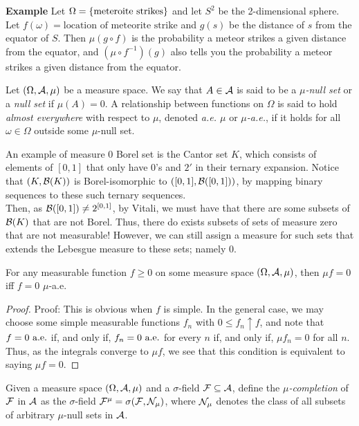 \begin{example}{\textbf{Example}}
    Let $\Omega = \{\tt{meteroite strikes}\}$ and let $S^2$ be the 2-dimensional sphere. Let $f(\omega) = \text{location of meteorite strike}$ and $g(s)$ be the distance of $s$ from the equator of $S$. Then $\mu(g \circ f)$ is the probability a meteor strikes a given distance from the equator, and $(\mu \circ f^{-1})(g)$ also tells you the probability a meteor strikes a given distance from the equator.  
\end{example}

\begin{definition}
   Let $(\Omega, \cal{A}, \mu)$ be a measure space. We say that $A \in \cal{A}$ is said to be a \emph{$\mu$-null set} or a \emph{null set} if $\mu(A) = 0$. A relationship between functions on $\Omega$ is said to hold \emph{almost everywhere} with respect to $\mu$, denoted \emph{a.e. $\mu$} or \emph{$\mu$-a.e.}, if it holds for all $\omega \in \Omega$ outside some $\mu$-null set. 
\end{definition}

An example of measure 0 Borel set is the Cantor set $K$, which consists of elements of $[0, 1]$ that only have $0$'s and $2'$ in their ternary expansion. Notice that $(K, \cal{B}(K))$ is Borel-isomorphic to $([0, 1], \cal{B}([0, 1]))$, by mapping binary sequences to these such ternary sequences.\\

Then, as $\cal{B}([0, 1]) \ne 2^{[0 ,1]}$, by Vitali, we must have that there are some subsets of $\cal{B}(K)$ that are not Borel. Thus, there do exists subsets of sets of measure zero that are not measurable! However, we can still assign a measure for such sets that extends the Lebesgue measure to these sets; namely 0.\\

\begin{lemma}
    For any measurable function $f \geq 0$ on some measure space $(\Omega, \cal{A}, \mu)$, then $\mu f = 0$ iff $f = 0$ $\mu$-a.e.
\end{lemma}
\begin{proof}{Proof:}
    This is obvious when $f$ is simple. In the general case, we may choose some simple measurable functions $f_n$ with $0 \leq f_n \uparrow f$, and note that $f = 0 \tt{ a.e.}$ if, and only if, $f_n = 0 \tt{ a.e.}$ for every $n$ if, and only if, $\mu f_n = 0$ for all $n$. Thus, as the integrals converge to $\mu f$, we see that this condition is equivalent to saying $\mu f = 0$. 
\end{proof}

\begin{definition}
    Given a measure space $(\Omega, \cal{A}, \mu)$ and a $\sigma$-field $\cal{F} \subseteq \cal{A}$, define the \emph{$\mu$-completion} of $\cal{F}$ in $\cal{A}$ as the $\sigma$-field $\cal{F}^{\mu} = \sigma(\cal{F}, \cal{N}_{\mu})$, where $\cal{N}_{\mu}$ denotes the class of all subsets of arbitrary $\mu$-null sets in $\cal{A}$. 
\end{definition}